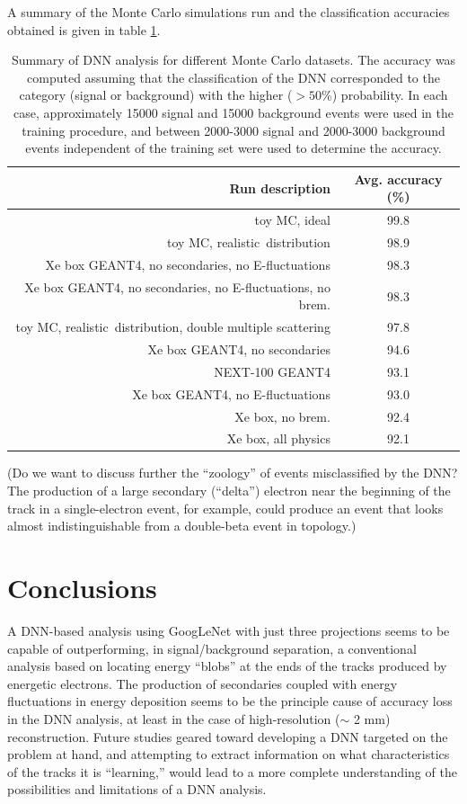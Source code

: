 \documentclass[a4paper,11pt]{article}
\begin{document}
A summary of the Monte Carlo simulations run and the classification accuracies obtained is given in table \ref{tbl.DNNsummary}.  

\begin{table}[!htb]
	\begin{center}
		\caption[DNN analysis summary]{\label{tbl.DNNsummary}Summary of DNN analysis for different Monte Carlo datasets.  The accuracy was computed assuming that the classification
			of the DNN corresponded to the category (signal or background) with the higher ($> 50$\%) probability.  In each case, approximately 15000 signal and 15000 background events were
			used in the training procedure, and between 2000-3000 signal and 2000-3000 background events independent of the training set were used to determine the accuracy.}
		\begin{tabular}{rc}
			\\
			\textbf{Run description} & \textbf{Avg. accuracy} (\%)\\
			\hline
			toy MC, ideal & 99.8\\
			toy MC, realistic \bbonu\,distribution & 98.9\\
			Xe box GEANT4, no secondaries, no E-fluctuations & 98.3\\
			Xe box GEANT4, no secondaries, no E-fluctuations, no brem. & 98.3\\
			toy MC, realistic \bbonu\,distribution, double multiple scattering & 97.8\\
			Xe box GEANT4, no secondaries & 94.6\\
			NEXT-100 GEANT4 & 93.1\\
			Xe box GEANT4, no E-fluctuations & 93.0\\
			Xe box, no brem. & 92.4\\
			Xe box, all physics & 92.1
		\end{tabular}
	\end{center}
\end{table}

(Do we want to discuss further the ``zoology'' of events misclassified by the DNN?  The production of a large secondary (``delta'') electron near the beginning of the track in a single-electron event, for example, could produce an event that looks almost indistinguishable from a double-beta event in topology.)

\section{Conclusions}
A DNN-based analysis using GoogLeNet with just three projections seems to be capable of outperforming, in signal/background separation, a conventional analysis based on locating energy ``blobs'' at the ends of the tracks produced by energetic electrons.  The production of secondaries coupled with energy fluctuations in energy deposition seems to be the principle cause of accuracy loss in the DNN analysis, at least in the case of high-resolution ($\sim$ 2 mm) reconstruction.  Future studies geared toward developing a DNN targeted on the problem at hand, and attempting to extract information on what characteristics of the tracks it is ``learning,'' would lead to a more complete understanding of the possibilities and limitations of a DNN analysis.
\end{document}
